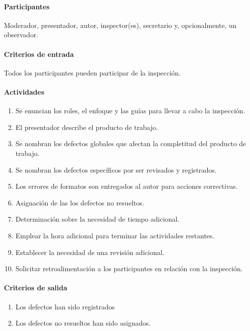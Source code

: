 \paragraph{Participantes\\}

Moderador, presentador, autor, inspector(es), secretario y, opcionalmente, un observador.

\paragraph{Criterios de entrada\\}

Todos los participantes pueden participar de la inspección.

\paragraph{Actividades}

\begin{enumerate}
	\item
		Se enuncian los roles, el enfoque y las guías para llevar a cabo la inspección.
	\item
		El presentador describe el producto de trabajo.
	\item		
		Se nombran los defectos globales que afectan la completitud del producto de trabajo.
	\item		
		Se nombran los defectos específicos por ser revisados y registrados.
	\item		
		Los errores de formatos son entregados al autor para acciones correctivas.
	\item
		Asignación de las los defectos no resueltos.
	\item 
		Determinación sobre la necesidad de tiempo adicional. 
	\item
		Emplear la hora adicional para terminar las actividades restantes.
	\item
		Establecer la necesidad de una revisión adicional.
	\item
		Solicitar retroalimentación a los participantes en relación con la inspección.
\end{enumerate}

\paragraph{Criterios de salida}

\begin{enumerate}
	\item
	Los defectos han sido registrados
	\item
	Los defectos no resueltos han sido asignados.
\end{enumerate}

